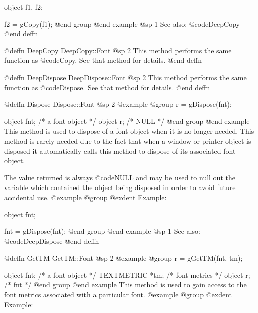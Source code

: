 object  f1, f2;

f2 = gCopy(f1);
@end group
@end example
@sp 1
See also:  @code{DeepCopy}
@end deffn











@deffn {DeepCopy} DeepCopy::Font
@sp 2
This method performs the same function as @code{Copy}.  See that
method for details.
@end deffn











@deffn {DeepDispose} DeepDispose::Font
@sp 2
This method performs the same function as @code{Dispose}.  See that
method for details.
@end deffn








@deffn {Dispose} Dispose::Font
@sp 2
@example
@group
r = gDispose(fnt);

object  fnt;   /*  a font object  */
object  r;     /*  NULL           */
@end group
@end example
This method is used to dispose of a font object when it is no longer
needed.  This method is rarely needed due to the fact that when a window
or printer object is disposed it automatically calls this method to
dispose of its associated font object.

The value returned is always @code{NULL} and may be used to null out
the variable which contained the object being disposed in order to
avoid future accidental use.
@example
@group
@exdent Example:

object  fnt;

fnt = gDispose(fnt);
@end group
@end example
@sp 1
See also:  @code{DeepDispose}
@end deffn










@deffn {GetTM} GetTM::Font
@sp 2
@example
@group
r = gGetTM(fnt, tm);

object      fnt;  /*  a font object  */
TEXTMETRIC  *tm;  /*  font metrics   */
object      r;    /*  fnt            */
@end group
@end example
This method is used to gain access to the font metrics associated with
a particular font.
@example
@group
@exdent Example:

